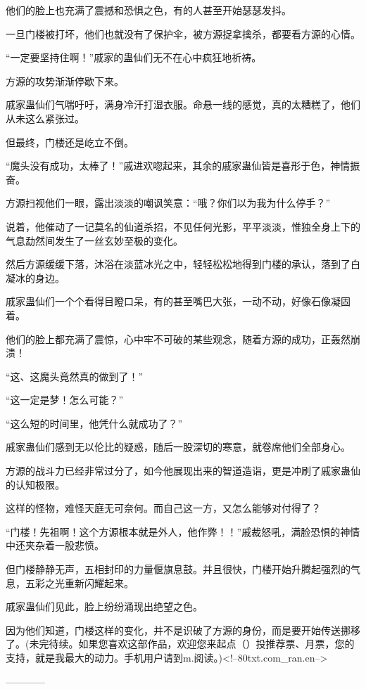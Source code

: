 \begin{this_body}
他们的脸上也充满了震撼和恐惧之色，有的人甚至开始瑟瑟发抖。

一旦门楼被打坏，他们也就没有了保护伞，被方源捉拿擒杀，都要看方源的心情。

“一定要坚持住啊！”戚家的蛊仙们无不在心中疯狂地祈祷。

方源的攻势渐渐停歇下来。

戚家蛊仙们气喘吁吁，满身冷汗打湿衣服。命悬一线的感觉，真的太糟糕了，他们从未这么紧张过。

但最终，门楼还是屹立不倒。

“魔头没有成功，太棒了！”戚进欢唿起来，其余的戚家蛊仙皆是喜形于色，神情振奋。

方源扫视他们一眼，露出淡淡的嘲讽笑意：“哦？你们以为我为什么停手？”

说着，他催动了一记莫名的仙道杀招，不见任何光影，平平淡淡，惟独全身上下的气息勐然间发生了一丝玄妙至极的变化。

然后方源缓缓下落，沐浴在淡蓝冰光之中，轻轻松松地得到门楼的承认，落到了白凝冰的身边。

戚家蛊仙们一个个看得目瞪口呆，有的甚至嘴巴大张，一动不动，好像石像凝固着。

他们的脸上都充满了震惊，心中牢不可破的某些观念，随着方源的成功，正轰然崩溃！

“这、这魔头竟然真的做到了！”

“这一定是梦！怎么可能？”

“这么短的时间里，他凭什么就成功了？”

戚家蛊仙们感到无以伦比的疑惑，随后一股深切的寒意，就卷席他们全部身心。

方源的战斗力已经非常过分了，如今他展现出来的智道造诣，更是冲刷了戚家蛊仙的认知极限。

这样的怪物，难怪天庭无可奈何。而自己这一方，又怎么能够对付得了？

“门楼！先祖啊！这个方源根本就是外人，他作弊！！”戚裁怒吼，满脸恐惧的神情中还夹杂着一股悲愤。

但门楼静静无声，五相封印的力量偃旗息鼓。并且很快，门楼开始升腾起强烈的气息，五彩之光重新闪耀起来。

戚家蛊仙们见此，脸上纷纷涌现出绝望之色。

因为他们知道，门楼这样的变化，并不是识破了方源的身份，而是要开始传送挪移了。(未完待续。如果您喜欢这部作品，欢迎您来起点（）投推荐票、月票，您的支持，就是我最大的动力。手机用户请到m.阅读。)<!--80txt.com\_ran.en-->

------------

\end{this_body}

